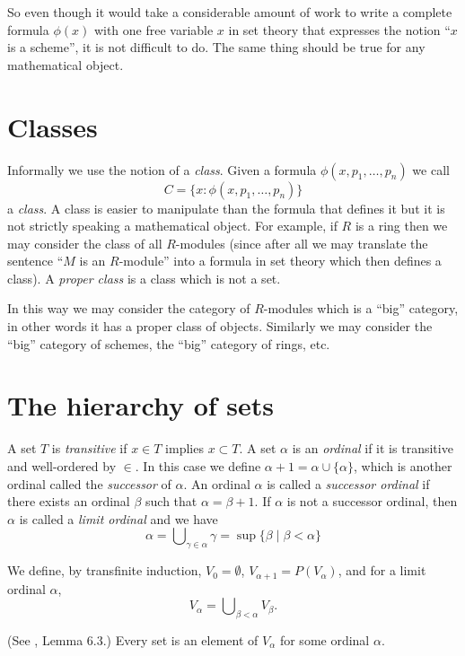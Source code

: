 \medskip\noindent
So even though it would take a considerable amount of work to write
a complete formula $\phi(x)$ with one free variable $x$ in set theory 
that expresses the notion ``$x$ is a scheme'', it is not difficult to do.
The same thing should be true for any mathematical object.

\section{Classes}
\label{section-classes}

\noindent
Informally we use the notion of a {\it class}. Given a formula
$\phi(x,p_1,\ldots,p_n)$ we call
$$
C = \{x : \phi(x,p_1,\ldots,p_n)\}
$$
a {\it class}. A class is easier to manipulate than the formula
that defines it but it is not strictly speaking a mathematical
object. For example, if $R$ is a ring then we may
consider the class of all $R$-modules (since after all we
may translate the sentence ``$M$ is an $R$-module''
into a formula in set theory which then defines a class).
A {\it proper class} is a class which is not a set.

\medskip\noindent
In this way we may consider the category of $R$-modules
which is a ``big'' category, in other words it has a
proper class of objects. Similarly we may consider
the ``big'' category of schemes, the ``big'' category
of rings, etc.

\section{The hierarchy of sets}
\label{section-sets-hierarchy}

\noindent
A set $T$ is {\it transitive} if $x\in T$ implies $x\subset T$.
A set $\alpha$ is an {\it ordinal} if it is transitive and well-ordered
by $\in$. In this case we define $\alpha + 1 = \alpha \cup \{\alpha\}$,
which is another ordinal called the {\it successor} of $\alpha$.
An ordinal $\alpha$ is called a {\it successor ordinal} if 
there exists an ordinal $\beta$ such that $\alpha = \beta + 1$.
If $\alpha$ is not a successor ordinal, then $\alpha$ is called
a {\it limit ordinal} and we have
$$
\alpha 
=
\bigcup\nolimits_{\gamma \in \alpha} \gamma
=
\sup \{\beta \mid \beta < \alpha \}
$$

\medskip\noindent
We define, by transfinite induction, $V_0 = \emptyset$,
$V_{\alpha + 1} = P(V_\alpha)$, and for a limit ordinal $\alpha$,
$$
V_\alpha = \bigcup\nolimits_{\beta < \alpha} V_\beta.
$$

\begin{lemma}
\label{axiom-regularity}
(See \cite{Jech}, Lemma 6.3.)
Every set is an element of $V_\alpha$ for some ordinal $\alpha$.
\end{lemma}

